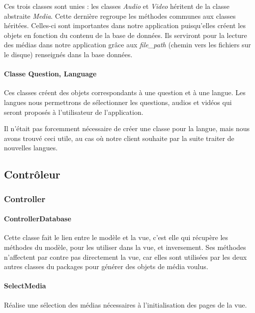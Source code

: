 Ces trois classes sont unies : les classes \textit{Audio} et \textit{Video} héritent de la classe abstraite \textit{Media}. Cette dernière regroupe les méthodes communes aux classes héritées. Celles-ci sont importantes dans notre application puisqu'elles créent les objets en fonction du contenu de la base de données. Ils serviront pour la lecture des médias dans notre application grâce aux \textit{file\_path} (chemin vers les fichiers sur le disque) renseignés dans la base données.

\paragraph{Classe Question, Language}

Ces classes créent des objets correspondants à une question et à une langue. Les langues nous permettrons de sélectionner les questions, audios et vidéos qui seront proposés à l'utilisateur de l'application.

Il n'était pas forcemment nécessaire de créer une classe pour la langue, mais nous avons trouvé ceci utile, au cas où notre client souhaite par la suite traiter de nouvelles langues.


\subsection{Contrôleur}


\subsubsection{Controller}

\paragraph{ControllerDatabase}

Cette classe fait le lien entre le modèle et la vue, c'est elle qui récupère les méthodes du modèle, pour les utiliser dans la vue, et inversement. Ses méthodes n'affectent par contre pas directement la vue, car elles sont utilisées par les deux autres classes du packages pour générer des objets de média voulus.

\paragraph{SelectMedia}

Réalise une sélection des médias nécessaires à l'initialisation des pages de la vue.

